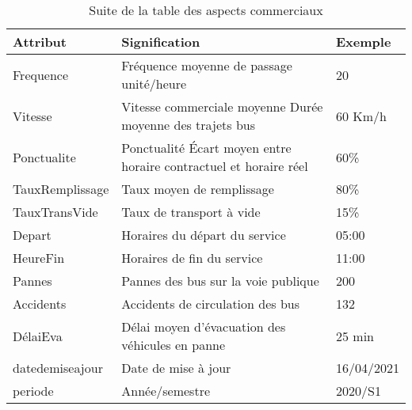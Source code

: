 	\begin{table}[H]
		\begin{center}
			\begin{tabularx}{17.5cm}{|p{4cm}|X|p{2cm}|}
				\hline
				\textbf{Attribut} & \textbf{Signification}                                            & \textbf{Exemple} \\
				\hline
				Frequence         & Fréquence moyenne de passage unité/heure                          & 20               \\
				\hline
				Vitesse           & Vitesse commerciale moyenne Durée moyenne des trajets bus         & 60 Km/h          \\
				\hline
				Ponctualite       & Ponctualité Écart moyen entre horaire contractuel et horaire réel & 60\%             \\
				\hline
				TauxRemplissage   & Taux moyen de remplissage                                         & 80\%             \\
				\hline
				TauxTransVide     & Taux de transport à vide                                          & 15\%             \\
				\hline
				Depart            & Horaires du départ du service                                     & 05:00            \\
				\hline
				HeureFin          & Horaires de fin du service                                        & 11:00            \\
				\hline
				Pannes            & Pannes des bus sur la voie publique                               & 200              \\
				\hline
				Accidents         & Accidents de circulation des bus                                  & 132              \\
				\hline
				DélaiEva          & Délai moyen d'évacuation des véhicules en panne                   & 25 min           \\
				\hline
				datedemiseajour   & Date de mise à jour                                               & 16/04/2021       \\
				\hline
				periode           & Année/semestre                                                    & 2020/S1          \\
				\hline
			\end{tabularx}
			\caption{Suite de la table des aspects commerciaux}
		\end{center}
	\end{table}


